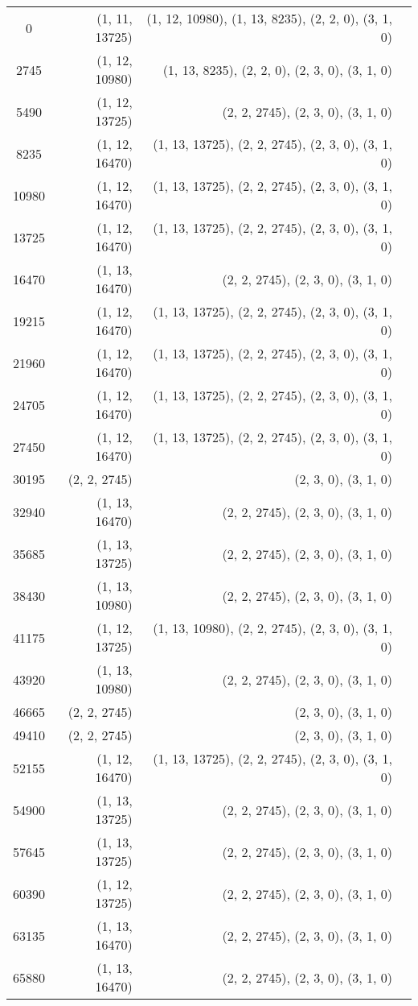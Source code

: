 \begin{longtable}[c]{c*{3}{r}}
0 & (1, 11, 13725) & (1, 12, 10980), (1, 13, 8235), (2, 2, 0), (3, 1, 0) \\
2745 & (1, 12, 10980) & (1, 13, 8235), (2, 2, 0), (2, 3, 0), (3, 1, 0) \\
5490 & (1, 12, 13725) & (2, 2, 2745), (2, 3, 0), (3, 1, 0) \\
8235 & (1, 12, 16470) & (1, 13, 13725), (2, 2, 2745), (2, 3, 0), (3, 1, 0) \\
10980 & (1, 12, 16470) & (1, 13, 13725), (2, 2, 2745), (2, 3, 0), (3, 1, 0) \\
13725 & (1, 12, 16470) & (1, 13, 13725), (2, 2, 2745), (2, 3, 0), (3, 1, 0) \\
16470 & (1, 13, 16470) & (2, 2, 2745), (2, 3, 0), (3, 1, 0) \\
19215 & (1, 12, 16470) & (1, 13, 13725), (2, 2, 2745), (2, 3, 0), (3, 1, 0) \\
21960 & (1, 12, 16470) & (1, 13, 13725), (2, 2, 2745), (2, 3, 0), (3, 1, 0) \\
24705 & (1, 12, 16470) & (1, 13, 13725), (2, 2, 2745), (2, 3, 0), (3, 1, 0) \\
27450 & (1, 12, 16470) & (1, 13, 13725), (2, 2, 2745), (2, 3, 0), (3, 1, 0) \\
30195 & (2, 2, 2745) & (2, 3, 0), (3, 1, 0) \\
32940 & (1, 13, 16470) & (2, 2, 2745), (2, 3, 0), (3, 1, 0) \\
35685 & (1, 13, 13725) & (2, 2, 2745), (2, 3, 0), (3, 1, 0) \\
38430 & (1, 13, 10980) & (2, 2, 2745), (2, 3, 0), (3, 1, 0) \\
41175 & (1, 12, 13725) & (1, 13, 10980), (2, 2, 2745), (2, 3, 0), (3, 1, 0) \\
43920 & (1, 13, 10980) & (2, 2, 2745), (2, 3, 0), (3, 1, 0) \\
46665 & (2, 2, 2745) & (2, 3, 0), (3, 1, 0) \\
49410 & (2, 2, 2745) & (2, 3, 0), (3, 1, 0) \\
52155 & (1, 12, 16470) & (1, 13, 13725), (2, 2, 2745), (2, 3, 0), (3, 1, 0) \\
54900 & (1, 13, 13725) & (2, 2, 2745), (2, 3, 0), (3, 1, 0) \\
57645 & (1, 13, 13725) & (2, 2, 2745), (2, 3, 0), (3, 1, 0) \\
60390 & (1, 12, 13725) & (2, 2, 2745), (2, 3, 0), (3, 1, 0) \\
63135 & (1, 13, 16470) & (2, 2, 2745), (2, 3, 0), (3, 1, 0) \\
65880 & (1, 13, 16470) & (2, 2, 2745), (2, 3, 0), (3, 1, 0) \\

\end{longtable}
